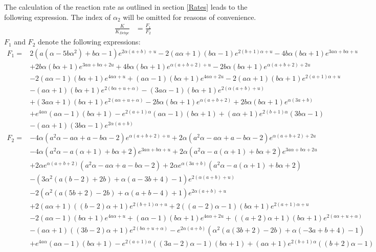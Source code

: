 The calculation of the reaction rate as outlined in section \ref{Rates} leads to the following expression. The index of $\alpha_2$ will be omitted for reasons of convenience.
\begin{align}
    \frac{K}{K_{Debye}} &= \frac{F_1}{F_2}
    \label{two_state_rate}
\end{align}
$F_1$ and $F_2$ denote the following expressions:
\begin{align*}
    F_1 =& 2 \left(a \left(\alpha-5 b \alpha^2\right)+b \alpha-1\right) e^{2 \alpha (a+b)+u}-2 (a \alpha+1) (b \alpha-1) e^{2 (b+1) \alpha+u}-4 b \alpha (b \alpha+1) e^{3 a \alpha+b \alpha+u} \\
    &+2 b \alpha (b \alpha+1) e^{3 a \alpha+b \alpha+2 u}+4 b \alpha (b \alpha+1) e^{\alpha (a+b+2)+u}-2 b \alpha (b \alpha+1) e^{\alpha (a+b+2)+2 u} \\
    &-2 (a \alpha-1) (b \alpha+1) e^{4 a \alpha+u}+(a \alpha-1) (b \alpha+1) e^{4 a \alpha+2 u}-2 (a \alpha+1) (b \alpha+1) e^{2 (a+1) \alpha+u} \\
    &-(a \alpha+1) (b \alpha+1) e^{2 (b \alpha+u+\alpha)}-(3 a \alpha-1) (b \alpha+1) e^{2 (\alpha (a+b)+u)} \\
    &+(3 a \alpha+1) (b \alpha+1) e^{2 (a \alpha+u+\alpha)}-2 b \alpha (b \alpha+1) e^{\alpha (a+b+2)}+2 b \alpha (b \alpha+1) e^{\alpha (3 a+b)} \\
    &+e^{4 a \alpha} (a \alpha-1) (b \alpha+1)-e^{2 (a+1) \alpha} (a \alpha-1) (b \alpha+1)+(a \alpha+1) e^{2 (b+1) \alpha} (3 b \alpha-1) \\
    &-(a \alpha+1) (3 b \alpha-1) e^{2 \alpha (a+b)} \\
    F_2 =& -4 \alpha \left(a^2 \alpha-a \alpha+a-b \alpha-2\right) e^{\alpha (a+b+2)+u}+2 \alpha \left(a^2 \alpha-a \alpha+a-b \alpha-2\right) e^{\alpha (a+b+2)+2 u} \\
    &-4 \alpha \left(a^2 \alpha-a (\alpha+1)+b \alpha+2\right) e^{3 a \alpha+b \alpha+u}+2 \alpha \left(a^2 \alpha-a (\alpha+1)+b \alpha+2\right) e^{3 a \alpha+b \alpha+2 u} \\
    &+2 \alpha e^{\alpha (a+b+2)} \left(a^2 \alpha-a \alpha+a-b \alpha-2\right)+2 \alpha e^{\alpha (3 a+b)} \left(a^2 \alpha-a (\alpha+1)+b \alpha+2\right) \\
    &-\left(3 \alpha^2 (a (b-2)+2 b)+\alpha (a-3 b+4)-1\right) e^{2 (\alpha (a+b)+u)} \\
    &-2 \left(\alpha^2 (a (5 b+2)-2 b)+\alpha (a+b-4)+1\right) e^{2 \alpha (a+b)+u} \\
    &+2 (a \alpha+1) ((b-2) \alpha+1) e^{2 (b+1) \alpha+u}+2 ((a-2) \alpha-1) (b \alpha+1) e^{2 (a+1) \alpha+u} \\
    &-2 (a \alpha-1) (b \alpha+1) e^{4 a \alpha+u}+(a \alpha-1) (b \alpha+1) e^{4 a \alpha+2 u}+((a+2) \alpha+1) (b \alpha+1) e^{2 (a \alpha+u+\alpha)} \\
    &-(a \alpha+1) ((3 b-2) \alpha+1) e^{2 (b \alpha+u+\alpha)}-e^{2 \alpha (a+b)} \left(\alpha^2 (a (3 b+2)-2 b)+\alpha (-3 a+b+4)-1\right) \\
    &+e^{4 a \alpha} (a \alpha-1) (b \alpha+1)-e^{2 (a+1) \alpha} ((3 a-2) \alpha-1) (b \alpha+1)+(a \alpha+1) e^{2 (b+1) \alpha} ((b+2) \alpha-1)
\end{align*}
